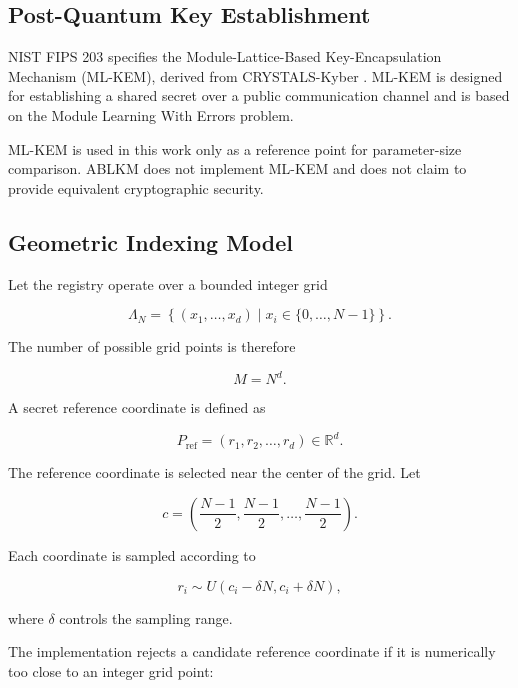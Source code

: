 \documentclass[journal,twocolumn]{IEEEtran}
\begin{document}
\subsection{Post-Quantum Key Establishment}

NIST FIPS 203 specifies the Module-Lattice-Based Key-Encapsulation Mechanism (ML-KEM), derived from CRYSTALS-Kyber \cite{nist2024}. ML-KEM is designed for establishing a shared secret over a public communication channel and is based on the Module Learning With Errors problem.

ML-KEM is used in this work only as a reference point for parameter-size comparison. ABLKM does not implement ML-KEM and does not claim to provide equivalent cryptographic security.

\subsection{Geometric Indexing Model}

Let the registry operate over a bounded integer grid

\begin{equation}
\Lambda_N =
\left\{
(x_1,\ldots,x_d) \mid x_i \in \{0,\ldots,N-1\}
\right\}.
\end{equation}

The number of possible grid points is therefore

\begin{equation}
M=N^d.
\end{equation}

A secret reference coordinate is defined as

\begin{equation}
P_{\mathrm{ref}}=(r_1,r_2,\ldots,r_d)\in\mathbb{R}^d.
\end{equation}

The reference coordinate is selected near the center of the grid. Let

\begin{equation}
c=
\left(
\frac{N-1}{2},
\frac{N-1}{2},
\ldots,
\frac{N-1}{2}
\right).
\end{equation}

Each coordinate is sampled according to

\begin{equation}
r_i\sim U(c_i-\delta N,c_i+\delta N),
\end{equation}

where $\delta$ controls the sampling range.

The implementation rejects a candidate reference coordinate if it is numerically too close to an integer grid point:
\end{document}
